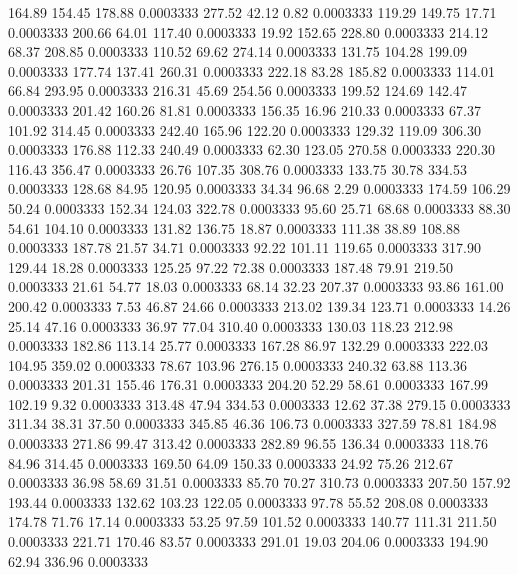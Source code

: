  164.89  154.45  178.88   0.0003333
 277.52   42.12    0.82   0.0003333
 119.29  149.75   17.71   0.0003333
 200.66   64.01  117.40   0.0003333
  19.92  152.65  228.80   0.0003333
 214.12   68.37  208.85   0.0003333
 110.52   69.62  274.14   0.0003333
 131.75  104.28  199.09   0.0003333
 177.74  137.41  260.31   0.0003333
 222.18   83.28  185.82   0.0003333
 114.01   66.84  293.95   0.0003333
 216.31   45.69  254.56   0.0003333
 199.52  124.69  142.47   0.0003333
 201.42  160.26   81.81   0.0003333
 156.35   16.96  210.33   0.0003333
  67.37  101.92  314.45   0.0003333
 242.40  165.96  122.20   0.0003333
 129.32  119.09  306.30   0.0003333
 176.88  112.33  240.49   0.0003333
  62.30  123.05  270.58   0.0003333
 220.30  116.43  356.47   0.0003333
  26.76  107.35  308.76   0.0003333
 133.75   30.78  334.53   0.0003333
 128.68   84.95  120.95   0.0003333
  34.34   96.68    2.29   0.0003333
 174.59  106.29   50.24   0.0003333
 152.34  124.03  322.78   0.0003333
  95.60   25.71   68.68   0.0003333
  88.30   54.61  104.10   0.0003333
 131.82  136.75   18.87   0.0003333
 111.38   38.89  108.88   0.0003333
 187.78   21.57   34.71   0.0003333
  92.22  101.11  119.65   0.0003333
 317.90  129.44   18.28   0.0003333
 125.25   97.22   72.38   0.0003333
 187.48   79.91  219.50   0.0003333
  21.61   54.77   18.03   0.0003333
  68.14   32.23  207.37   0.0003333
  93.86  161.00  200.42   0.0003333
   7.53   46.87   24.66   0.0003333
 213.02  139.34  123.71   0.0003333
  14.26   25.14   47.16   0.0003333
  36.97   77.04  310.40   0.0003333
 130.03  118.23  212.98   0.0003333
 182.86  113.14   25.77   0.0003333
 167.28   86.97  132.29   0.0003333
 222.03  104.95  359.02   0.0003333
  78.67  103.96  276.15   0.0003333
 240.32   63.88  113.36   0.0003333
 201.31  155.46  176.31   0.0003333
 204.20   52.29   58.61   0.0003333
 167.99  102.19    9.32   0.0003333
 313.48   47.94  334.53   0.0003333
  12.62   37.38  279.15   0.0003333
 311.34   38.31   37.50   0.0003333
 345.85   46.36  106.73   0.0003333
 327.59   78.81  184.98   0.0003333
 271.86   99.47  313.42   0.0003333
 282.89   96.55  136.34   0.0003333
 118.76   84.96  314.45   0.0003333
 169.50   64.09  150.33   0.0003333
  24.92   75.26  212.67   0.0003333
  36.98   58.69   31.51   0.0003333
  85.70   70.27  310.73   0.0003333
 207.50  157.92  193.44   0.0003333
 132.62  103.23  122.05   0.0003333
  97.78   55.52  208.08   0.0003333
 174.78   71.76   17.14   0.0003333
  53.25   97.59  101.52   0.0003333
 140.77  111.31  211.50   0.0003333
 221.71  170.46   83.57   0.0003333
 291.01   19.03  204.06   0.0003333
 194.90   62.94  336.96   0.0003333

